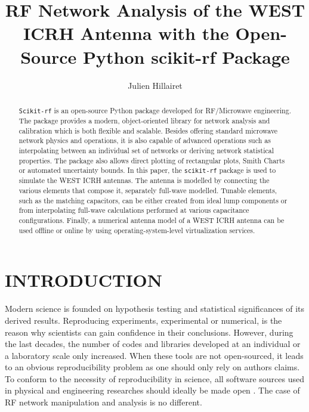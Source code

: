 \documentclass{aip-cp}
\begin{document}
	
	\title{RF Network Analysis of the WEST ICRH Antenna with the Open-Source Python scikit-rf Package}
	
	\author[IRFM]{Julien Hillairet}
	
	\maketitle
	
	
	\begin{abstract}
		\texttt{Scikit-rf} is an open-source Python package developed for RF/Microwave engineering. The package provides a modern, object-oriented library for network analysis and calibration which is both flexible and scalable. Besides offering standard microwave network physics and operations, it is also capable of advanced operations such as interpolating between an individual set of networks or deriving network statistical properties. The package also allows direct plotting of rectangular plots, Smith Charts or automated uncertainty bounds. In this paper, the \texttt{scikit-rf} package is used to simulate the WEST ICRH antennas. The antenna is modelled by connecting the various elements that compose it, separately full-wave modelled. Tunable elements, such as the matching capacitors, can be either created from ideal lump components or from interpolating full-wave calculations performed at various capacitance configurations. Finally, a numerical antenna model of a WEST ICRH antenna can be used offline or online by using operating-system-level virtualization services.
	\end{abstract}
	
	
	\section{INTRODUCTION}
	Modern science is founded on hypothesis testing and statistical significances of its derived results. Reproducing experiments, experimental or numerical, is the reason why scientists can gain confidence in their conclusions. However, during the last decades, the number of codes and libraries developed at an individual or a laboratory scale only increased. When these tools are not open-sourced, it leads to an obvious reproducibility problem as one should only rely on authors claims. To conform to the necessity of reproducibility in science, all software sources used in physical and engineering researches should ideally be made open \cite{Ince2012}. The case of RF network manipulation and analysis is no different.
	
\end{document}
